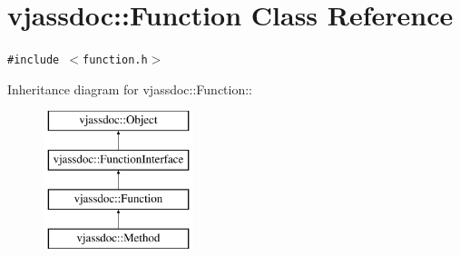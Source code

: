 \hypertarget{classvjassdoc_1_1Function}{
\section{vjassdoc::Function Class Reference}
\label{classvjassdoc_1_1Function}
}
{\tt \#include $<$function.h$>$}

Inheritance diagram for vjassdoc::Function::\begin{figure}[H]
\begin{center}
\leavevmode
\includegraphics[height=4cm]{classvjassdoc_1_1Function}
\end{center}
\end{figure}
